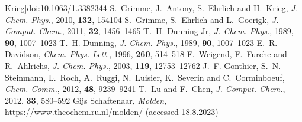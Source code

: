 \documentclass[twoside,twocolumn,9pt]{article}
\begin{document}
\begin{mcitethebibliography}{79}
  Krieg]{doi:10.1063/1.3382344}
S.~Grimme, J.~Antony, S.~Ehrlich and H.~Krieg, \emph{J. Chem. Phys.}, 2010,
  \textbf{132}, 154104\relax
\mciteBstWouldAddEndPuncttrue
\mciteSetBstMidEndSepPunct{\mcitedefaultmidpunct}
{\mcitedefaultendpunct}{\mcitedefaultseppunct}\relax
\EndOfBibitem
{}
S.~Grimme, S.~Ehrlich and L.~Goerigk, \emph{J. Comput. Chem.}, 2011,
  \textbf{32}, 1456--1465\relax
\mciteBstWouldAddEndPuncttrue
\mciteSetBstMidEndSepPunct{\mcitedefaultmidpunct}
{\mcitedefaultendpunct}{\mcitedefaultseppunct}\relax
\EndOfBibitem
{}
T.~H. {Dunning Jr}, \emph{J. Chem. Phys.}, 1989, \textbf{90}, 1007--1023\relax
\mciteBstWouldAddEndPuncttrue
\mciteSetBstMidEndSepPunct{\mcitedefaultmidpunct}
{\mcitedefaultendpunct}{\mcitedefaultseppunct}\relax
\EndOfBibitem
{}
T.~H. Dunning, \emph{J. Chem. Phys.}, 1989, \textbf{90}, 1007--1023\relax
\mciteBstWouldAddEndPuncttrue
\mciteSetBstMidEndSepPunct{\mcitedefaultmidpunct}
{\mcitedefaultendpunct}{\mcitedefaultseppunct}\relax
\EndOfBibitem
{}
E.~R. Davidson, \emph{Chem. Phys. Lett.}, 1996, \textbf{260}, 514--518\relax
\mciteBstWouldAddEndPuncttrue
\mciteSetBstMidEndSepPunct{\mcitedefaultmidpunct}
{\mcitedefaultendpunct}{\mcitedefaultseppunct}\relax
\EndOfBibitem
{}
F.~Weigend, F.~Furche and R.~Ahlrichs, \emph{J. Chem. Phys.}, 2003,
  \textbf{119}, 12753--12762\relax
\mciteBstWouldAddEndPuncttrue
\mciteSetBstMidEndSepPunct{\mcitedefaultmidpunct}
{\mcitedefaultendpunct}{\mcitedefaultseppunct}\relax
\EndOfBibitem
{}
J.~F. Gonthier, S.~N. Steinmann, L.~Roch, A.~Ruggi, N.~Luisier, K.~Severin and
  C.~Corminboeuf, \emph{Chem. Comm.}, 2012, \textbf{48}, 9239--9241\relax
\mciteBstWouldAddEndPuncttrue
\mciteSetBstMidEndSepPunct{\mcitedefaultmidpunct}
{\mcitedefaultendpunct}{\mcitedefaultseppunct}\relax
\EndOfBibitem
{}
T.~Lu and F.~Chen, \emph{J. Comput. Chem.}, 2012, \textbf{33}, 580--592\relax
\mciteBstWouldAddEndPuncttrue
\mciteSetBstMidEndSepPunct{\mcitedefaultmidpunct}
{\mcitedefaultendpunct}{\mcitedefaultseppunct}\relax
\EndOfBibitem
{}
{Gijs Schaftenaar}, \emph{Molden}, \url{https://www.theochem.ru.nl/molden/}
  (accessed 18.8.2023)\relax

\end{mcitethebibliography}
\end{document}
